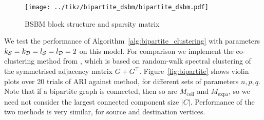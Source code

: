 \begin{figure}[H]
	\centering
	\texttt{[image: ../tikz/bipartite\_dsbm/bipartite\_dsbm.pdf]}
	\caption{BSBM block structure and sparsity matrix}
	\label{fig:bipartite_bsbm}
\end{figure}








We test the performance of Algorithm~\ref{alg:bipartite_clustering} with parameters $k_{\mathcal{S}} = k_{\mathcal{D}} = l_{\mathcal{S}} = l_{\mathcal{D}} = 2$ on this model.
For comparison we implement the co-clustering method from \cite{dhillon2001co}, which is based on random-walk spectral clustering of the symmetrised adjacency matrix $G+G^\top$.
Figure~\ref{fig:bipartite} shows violin plots over 20 trials of ARI against method, for different sets of parameters $n,p,q$.
Note that if a bipartite graph is connected, then so are $M_\mathrm{coll}$ and $M_\mathrm{expa}$, so we need not consider the largest connected component size $|C|$.
Performance of the two methods is very similar, for source and destination vertices.





